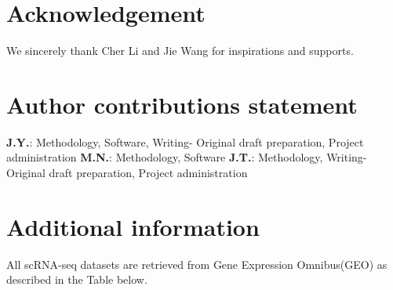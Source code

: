 \documentclass[fleqn,10pt]{wlscirep}
\begin{document}

\section*{Acknowledgement}
  We sincerely thank Cher Li and Jie Wang for inspirations and supports.





\section*{Author contributions statement}
  \textbf{J.Y.}: Methodology, Software, Writing- Original draft preparation, Project administration
  \textbf{M.N.}: Methodology, Software
  \textbf{J.T.}: Methodology, Writing- Original draft preparation, Project administration

\section*{Additional information}
  All scRNA-seq datasets are retrieved from Gene Expression Omnibus(GEO) as described in the Table below.
\end{document}
